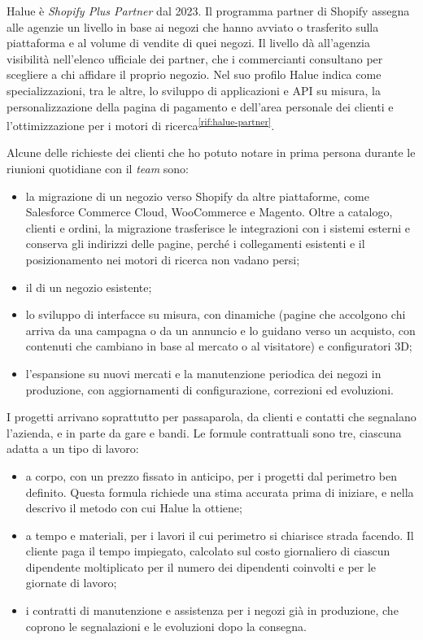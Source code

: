 Halue è \emph{Shopify Plus Partner} dal 2023. Il programma partner di Shopify assegna alle agenzie
un livello in base ai negozi che hanno avviato o trasferito sulla piattaforma e al volume di vendite
di quei negozi. Il livello dà all’agenzia visibilità nell’elenco ufficiale dei partner, che i
commercianti consultano per scegliere a chi affidare il proprio negozio. Nel suo profilo Halue
indica come specializzazioni, tra le altre, lo sviluppo di applicazioni e API su misura, la
personalizzazione della pagina di pagamento e dell’area personale dei clienti e l’ottimizzazione per i
motori di ricerca\textsuperscript{\ref{rif:halue-partner}}.

Alcune delle richieste dei clienti che ho potuto notare in prima persona durante le riunioni
quotidiane con il \emph{team} sono:

\begin{itemize}
	\item la migrazione di un negozio verso Shopify da altre piattaforme, come Salesforce Commerce
	Cloud, WooCommerce e Magento. Oltre a catalogo, clienti e ordini, la migrazione trasferisce le
	integrazioni con i sistemi esterni e conserva gli indirizzi delle pagine, perché i collegamenti
	esistenti e il posizionamento nei motori di ricerca non vadano persi;
	\item il  di un negozio esistente;
	\item lo sviluppo di interfacce su misura, con 
	dinamiche (pagine che accolgono chi arriva da una campagna o da un annuncio e lo guidano verso
	un acquisto, con contenuti che cambiano in base al mercato o al visitatore) e configuratori 3D;
	\item l’espansione su nuovi mercati e la manutenzione periodica dei negozi in produzione, con
	aggiornamenti di configurazione, correzioni ed evoluzioni.
\end{itemize}

I progetti arrivano soprattutto per passaparola, da clienti e contatti che segnalano l’azienda, e
in parte da gare e bandi. Le formule contrattuali sono tre, ciascuna adatta a un tipo di lavoro:

\begin{itemize}
	\item a corpo, con un prezzo fissato in anticipo, per i progetti dal perimetro ben definito.
	Questa formula richiede una stima accurata prima di iniziare, e nella
	 descrivo il metodo con cui Halue la ottiene;
	\item a tempo e materiali, per i lavori il cui perimetro si chiarisce strada facendo. Il
	cliente paga il tempo impiegato, calcolato sul costo giornaliero di ciascun dipendente
	moltiplicato per il numero dei dipendenti coinvolti e per le giornate di lavoro;
	\item i contratti di manutenzione e assistenza per i negozi già in produzione, che coprono le
	segnalazioni e le evoluzioni dopo la consegna.
\end{itemize}

